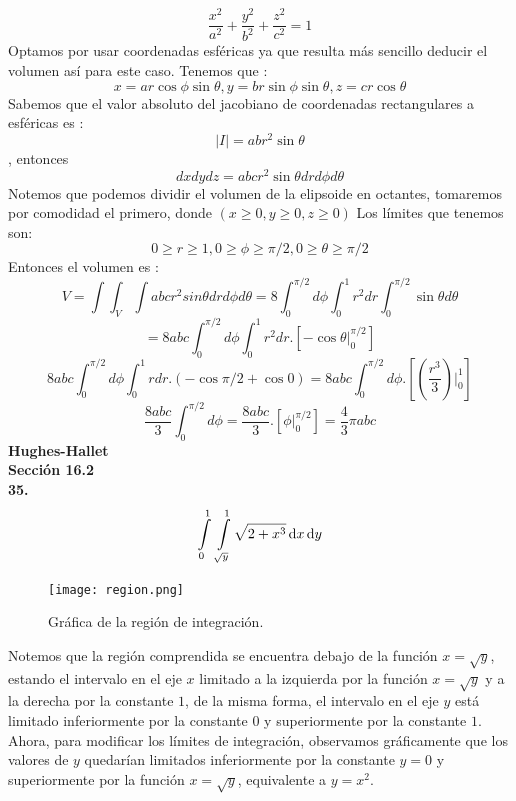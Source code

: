\documentclass[11pt]{report}
\begin{document}
\[ \frac{x^2}{a^2} + \frac{y^2}{b^2} + \frac{z^2}{c^2} = 1 \]
Optamos por usar coordenadas esféricas ya que resulta más sencillo deducir el volumen así para este caso.
Tenemos que :
\[x = ar \cos \phi \sin\theta, y = br \sin \phi \sin \theta, z= cr \cos \theta\]
Sabemos que el valor absoluto del jacobiano de coordenadas rectangulares a esféricas es :
\[|I|= abr^2 \sin \theta\], entonces
\[dxdydz= abcr^2 \sin \theta dr d\phi d\theta\]
Notemos que podemos dividir el volumen de la elipsoide en octantes, tomaremos por comodidad el primero,
donde $(x \geq 0, y \geq 0, z \geq 0)$
Los límites que tenemos son:
\[0 \geq r \geq 1, 0\geq \phi \geq \pi / 2 , 0 \geq \theta \geq \pi /2\]
Entonces el volumen es :
\[V = \int \int_V \int abcr^2 sin \theta dr d\phi d\theta = 8 \int_0^{\pi/2} d\phi \int_0^1 r^2 dr \int_0^{\pi /2}\sin \theta d\theta\]
\[= 8abc \int_0^{\pi /2} d\phi \int_0^1 r^2dr. \left[-\cos \theta |_0^{\pi /2} \right]\]
\[8abc \int_0^{\pi / 2} d\phi \int_0^1 r dr . \left( - \cos \pi / 2 + \cos 0\right) = 8abc \int_0^{\pi /2} d\phi. \left[ \left( \dfrac{r^3}{3}\right)|_0^1\right]\]
\[\dfrac{8abc}{3} \int_0 ^{\pi / 2} d\phi = \dfrac{8abc}{3}. \left[\phi |_0^{\pi /2} \right] = \dfrac{4}{3}\pi abc\]
\textbf{Hughes-Hallet} \\

\textbf{Sección 16.2}\\

\textbf{35.} \\

\[ \int \limits_0^1 \, \int \limits_{\sqrt{y}}^1 \sqrt{2 + x^3} \, \text dx \, \text dy \]

\begin{figure}[h]
	\texttt{[image: region.png]}
	\centering
	\caption{Gráfica de la región de integración.}
	\centering
\end{figure}

Notemos que la región comprendida se encuentra debajo de la función $x = \sqrt{y}$,
estando el intervalo en el eje $x$ limitado a la izquierda por la función
$x = \sqrt{y} $ y a la derecha por la constante $1$, de la misma forma, el
intervalo en el eje $y$ está limitado inferiormente por la constante $0$
y superiormente por la constante $1$.\\

Ahora, para modificar los límites de integración, observamos gráficamente que
los valores de $y$ quedarían limitados inferiormente por la constante $y = 0$
y superiormente por la función $x = \sqrt{y}$, equivalente a $y = x^2$.\\
\end{document}
